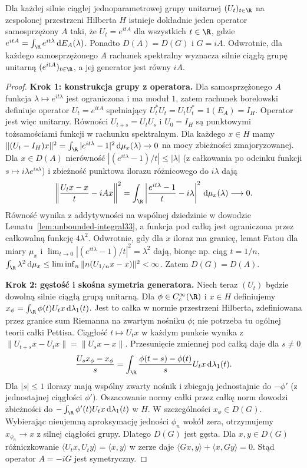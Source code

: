 \begin{twierdzenie}
\label{thm:stone33}
Dla każdej silnie ciągłej jednoparametrowej grupy unitarnej
$(U_t)_{t\in\R}$ na zespolonej przestrzeni Hilberta $H$
istnieje dokładnie jeden operator samosprzężony $A$ taki, że
$U_t=e^{itA}$ dla wszystkich $t\in\R$, gdzie
$e^{itA}=\int_\R e^{it\lambda}\,\mathrm dE_A(\lambda)$.
Ponadto $D(A)=D(G)$ i $G=iA$.
Odwrotnie, dla każdego samosprzężonego $A$ rachunek spektralny
wyznacza silnie ciągłą grupę unitarną $(e^{itA})_{t\in\R}$,
a jej generator jest równy $iA$.
\end{twierdzenie}
\begin{proof}
\textbf{Krok 1: konstrukcja grupy z operatora.}
Dla samosprzężonego $A$ funkcja $\lambda\mapsto e^{it\lambda}$
jest ograniczona i ma moduł $1$, zatem rachunek borelowski
definiuje operator $U_t=e^{itA}$ spełniający
$U_t^*U_t=U_tU_t^*=1(E_A)=I_H$. Operator jest więc unitarny.
Równości $U_{t+s}=U_tU_s$ i $U_0=I_H$ są punktowymi
tożsamościami funkcji w rachunku spektralnym.
Dla każdego $x\in H$ mamy
$\|(U_t-I_H)x\|^2=\int_\R|e^{it\lambda}-1|^2\,\mathrm d\mu_x(\lambda)
\to0$ na mocy zbieżności zmajoryzowanej.
Dla $x\in D(A)$ nierówność
$|(e^{it\lambda}-1)/t|\le|\lambda|$ (z całkowania po odcinku
funkcji $s\mapsto i\lambda e^{is\lambda}$) i zbieżność punktowa
ilorazu różnicowego do $i\lambda$ dają
\[
 \left\|\frac{U_tx-x}{t}-iAx\right\|^2
 =\int_\R\left|\frac{e^{it\lambda}-1}{t}-i\lambda\right|^2
 \,\mathrm d\mu_x(\lambda)\longrightarrow0.
\]
Równość wynika z addytywności na wspólnej dziedzinie
w dowodzie Lematu~\ref{lem:unbounded-integral33}, a funkcja pod
całką jest ograniczona przez całkowalną funkcję $4\lambda^2$.
Odwrotnie, gdy dla $x$ iloraz ma granicę, lemat Fatou
dla miary $\mu_x$ i
$\lim_{t\to0}|(e^{it\lambda}-1)/t|^2=\lambda^2$
dają, biorąc np. ciąg $t=1/n$,
$\int_\R\lambda^2\,\mathrm d\mu_x\le
\liminf_n\|n(U_{1/n}x-x)\|^2<\infty$.
Zatem $D(G)=D(A)$.

\textbf{Krok 2: gęstość i skośna symetria generatora.}
Niech teraz $(U_t)$ będzie dowolną silnie ciągłą grupą unitarną.
Dla $\phi\in C_c^\infty(\R)$ i $x\in H$ definiujemy
$x_\phi=\int_\R\phi(t)U_tx\,\mathrm d\lambda_1(t)$.
Jest to całka w normie przestrzeni Hilberta, zdefiniowana
przez granice sum Riemanna na zwartym nośniku $\phi$;
nie potrzeba tu ogólnej teorii całki Pettisa. Ciągłość
$t\mapsto U_tx$ w każdym punkcie wynika z
$\|U_{t+s}x-U_tx\|=\|U_sx-x\|$.
Przesunięcie zmiennej pod całką daje dla $s\ne0$
\[
 \frac{U_sx_\phi-x_\phi}{s}
 =\int_\R\frac{\phi(t-s)-\phi(t)}s U_tx\,\mathrm d\lambda_1(t).
\]
Dla $|s|\le1$ ilorazy mają wspólny zwarty nośnik i zbiegają
jednostajnie do $-\phi'$ (z jednostajnej ciągłości $\phi'$).
Oszacowanie normy całki przez całkę norm dowodzi zbieżności
do $-\int_\R\phi'(t)U_tx\,\mathrm d\lambda_1(t)$ w $H$.
W szczególności $x_\phi\in D(G)$. Wybierając
nieujemną aproksymację jedności $\phi_n$ wokół zera,
otrzymujemy $x_{\phi_n}\to x$ z silnej ciągłości grupy.
Dlatego $D(G)$ jest gęsta.
Dla $x,y\in D(G)$ różniczkowanie
$\langle U_tx,U_ty\rangle=\langle x,y\rangle$ w zerze daje
$\langle Gx,y\rangle+\langle x,Gy\rangle=0$.
Stąd operator $A=-iG$ jest symetryczny.


\end{proof}
